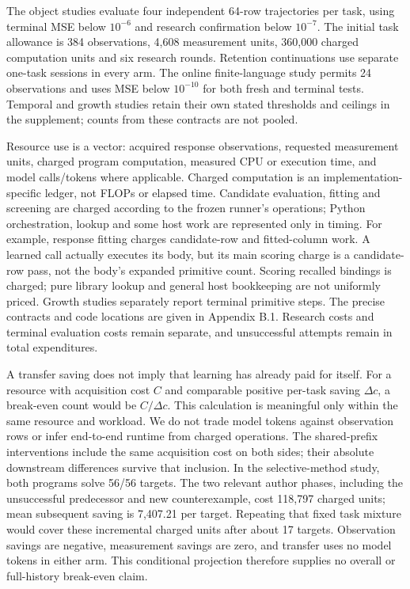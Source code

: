 \documentclass[11pt,a4paper]{article}
\begin{document}
The object studies evaluate four independent 64-row trajectories per task, using terminal MSE below \(10^{-6}\) and research confirmation below \(10^{-7}\). The initial task allowance is 384 observations, 4,608 measurement units, 360,000 charged computation units and six research rounds. Retention continuations use separate one-task sessions in every arm. The online finite-language study permits 24 observations and uses MSE below \(10^{-10}\) for both fresh and terminal tests. Temporal and growth studies retain their own stated thresholds and ceilings in the supplement; counts from these contracts are not pooled.


Resource use is a vector: acquired response observations, requested measurement units, charged program computation, measured CPU or execution time, and model calls/tokens where applicable. Charged computation is an implementation-specific ledger, not FLOPs or elapsed time. Candidate evaluation, fitting and screening are charged according to the frozen runner's operations; Python orchestration, lookup and some host work are represented only in timing. For example, response fitting charges candidate-row and fitted-column work. A learned call actually executes its body, but its main scoring charge is a candidate-row pass, not the body's expanded primitive count. Scoring recalled bindings is charged; pure library lookup and general host bookkeeping are not uniformly priced. Growth studies separately report terminal primitive steps. The precise contracts and code locations are given in Appendix B.1. Research costs and terminal evaluation costs remain separate, and unsuccessful attempts remain in total expenditures.


A transfer saving does not imply that learning has already paid for itself. For a resource with acquisition cost \(C\) and comparable positive per-task saving \(\Delta c\), a break-even count would be \(C/\Delta c\). This calculation is meaningful only within the same resource and workload. We do not trade model tokens against observation rows or infer end-to-end runtime from charged operations. The shared-prefix interventions include the same acquisition cost on both sides; their absolute downstream differences survive that inclusion. In the selective-method study, both programs solve 56/56 targets. The two relevant author phases, including the unsuccessful predecessor and new counterexample, cost 118,797 charged units; mean subsequent saving is 7,407.21 per target. Repeating that fixed task mixture would cover these incremental charged units after about 17 targets. Observation savings are negative, measurement savings are zero, and transfer uses no model tokens in either arm. This conditional projection therefore supplies no overall or full-history break-even claim.
\end{document}
